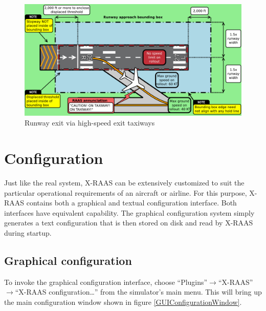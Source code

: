 \documentclass[a4paper,12pt]{article}
\begin{document}
\begin{figure}[H]
\begin{center}
\includegraphics[width=\textwidth]{../src/taxi_offrwy.pdf}
\end{center}
\caption{Runway exit via high-speed exit taxiways}
\end{figure}

\section{Configuration}
\label{sec:Configuration}

Just like the real system, X-RAAS can be extensively customized to suit
the particular operational requirements of an aircraft or airline. For
this purpose, X-RAAS contains both a graphical and textual configuration
interface. Both interfaces have equivalent capability. The graphical
configuration system simply generates a text configuration that is then
stored on disk and read by X-RAAS during startup.

\subsection{Graphical configuration}
\label{subsec:GUIConfiguration}

To invoke the graphical configuration interface, choose
``Plugins''$\rightarrow$``X-RAAS''$\rightarrow$``X-RAAS configuration\ldots''
from the simulator's main menu. This will bring up the main
configuration window shown in figure \ref{GUIConfigurationWindow}.
\end{document}
